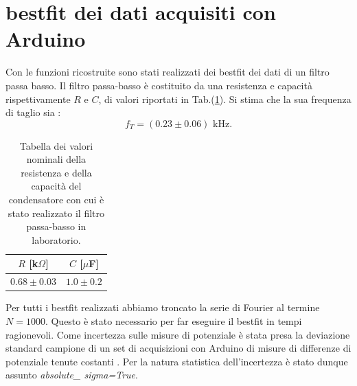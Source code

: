 \documentclass{article}
\begin{document}
\section{bestfit dei dati acquisiti con Arduino}
    \label{sez:bestfit_ft}
    Con le funzioni ricostruite sono stati realizzati dei bestfit dei dati
    di un filtro passa basso.
    Il filtro passa-basso è costituito da una resistenza e capacità rispettivamente $R$ e $C$, di valori riportati in Tab.(\ref{tab:val_nom}).
    Si stima che la sua frequenza di taglio sia :
   $$
   f_T = (0.23 \pm 0.06) \text{ kHz}.
   $$
    \begin{table}[htbp]
        \centering
        \begin{tabular}{c c}
            \hline
            $R$ [k$\Omega$] & $C$ [$\mu$F] \\
            \hline
            $0.68 \pm 0.03$ & $1.0 \pm 0.2$ \\
            \hline
        \end{tabular}
        \caption{Tabella dei valori nominali della resistenza e della capacità del condensatore con cui è stato realizzato il filtro passa-basso in laboratorio.}
        \label{tab:val_nom}
    \end{table}
  
    \noindent Per tutti i bestfit realizzati abbiamo troncato la serie di Fourier al termine $N=1000$. Questo è stato necessario per far eseguire il 
    bestfit in tempi ragionevoli.
    Come incertezza sulle misure di potenziale è stata
    presa la deviazione standard campione di un set di acquisizioni con Arduino 
    di misure di differenze di potenziale tenute costanti \cite{Antonacci_Sermi2024}.
    Per la natura statistica dell'incertezza è stato dunque assunto \emph{absolute\_ sigma=True}.
\end{document}
